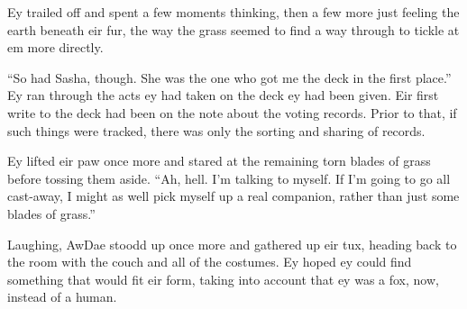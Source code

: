 Ey trailed off and spent a few moments thinking, then a few more just feeling the earth beneath eir fur, the way the grass seemed to find a way through to tickle at em more directly.

``So had Sasha, though.  She was the one who got me the deck in the first place.''  Ey ran through the acts ey had taken on the deck ey had been given.  Eir first write to the deck had been on the note about the voting records.  Prior to that, if such things were tracked, there was only the sorting and sharing of records.

Ey lifted eir paw once more and stared at the remaining torn blades of grass before tossing them aside.  ``Ah, hell.  I'm talking to myself.  If I'm going to go all cast-away, I might as well pick myself up a real companion, rather than just some blades of grass.''

Laughing, AwDae stoodd up once more and gathered up eir tux, heading back to the room with the couch and all of the costumes.  Ey hoped ey could find something that would fit eir form, taking into account that ey was a fox, now, instead of a human.
